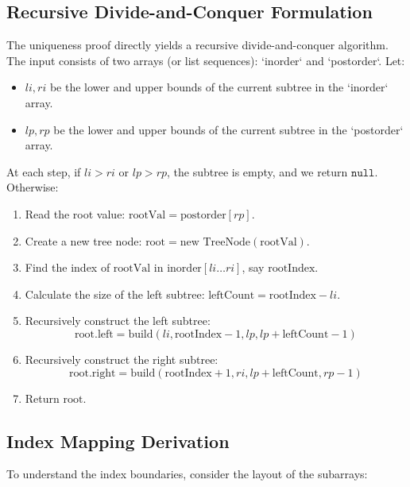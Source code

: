 \documentclass[10pt,journal,compsoc,onecolumn]{IEEEtran}
\begin{document}
\subsection{Recursive Divide-and-Conquer Formulation}
The uniqueness proof directly yields a recursive divide-and-conquer algorithm. The input consists of two arrays (or list sequences): `inorder` and `postorder`.
Let:
\begin{itemize}
    \item $li, ri$ be the lower and upper bounds of the current subtree in the `inorder` array.
    \item $lp, rp$ be the lower and upper bounds of the current subtree in the `postorder` array.
\end{itemize}

At each step, if $li > ri$ or $lp > rp$, the subtree is empty, and we return $\texttt{null}$.
Otherwise:
\begin{enumerate}
    \item Read the root value: $\text{rootVal} = \text{postorder}[rp]$.
    \item Create a new tree node: $\text{root} = \text{new TreeNode}(\text{rootVal})$.
    \item Find the index of $\text{rootVal}$ in $\text{inorder}[li \dots ri]$, say $\text{rootIndex}$.
    \item Calculate the size of the left subtree: $\text{leftCount} = \text{rootIndex} - li$.
    \item Recursively construct the left subtree:
    \[
    \text{root.left} = \text{build}(li, \text{rootIndex}-1, lp, lp+\text{leftCount}-1)
    \]
    \item Recursively construct the right subtree:
    \[
    \text{root.right} = \text{build}(\text{rootIndex}+1, ri, lp+\text{leftCount}, rp-1)
    \]
    \item Return $\text{root}$.
\end{enumerate}

\subsection{Index Mapping Derivation}

To understand the index boundaries, consider the layout of the subarrays:
\end{document}
